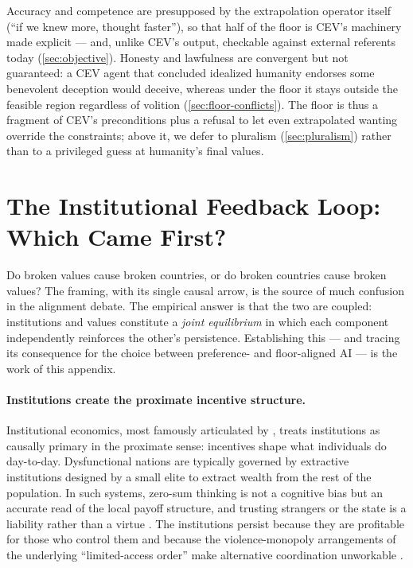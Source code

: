 \documentclass{article}
\theoremstyle{plain}
\theoremstyle{definition}
\theoremstyle{remark}
\begin{document}
Accuracy and competence are presupposed by the extrapolation operator itself (``if we knew more, thought faster''), so that half of the floor is CEV's machinery made explicit --- and, unlike CEV's output, checkable against external referents today (\cref{sec:objective}). Honesty and lawfulness are convergent but not guaranteed: a CEV agent that concluded idealized humanity endorses some benevolent deception \citep{taylorbrown1988illusion} would deceive, whereas under the floor it stays outside the feasible region regardless of volition (\cref{sec:floor-conflicts}). The floor is thus a fragment of CEV's preconditions plus a refusal to let even extrapolated wanting override the constraints; above it, we defer to pluralism (\cref{sec:pluralism}) rather than to a privileged guess at humanity's final values.




\newpage
\appendix
\onecolumn
\section{The Institutional Feedback Loop: Which Came First?}
\label{app:institutions}

Do broken values cause broken countries, or do broken countries cause broken values? The framing, with its single causal arrow, is the source of much confusion in the alignment debate. The empirical answer is that the two are coupled: institutions and values constitute a \emph{joint equilibrium} in which each component independently reinforces the other's persistence. Establishing this --- and tracing its consequence for the choice between preference- and floor-aligned AI --- is the work of this appendix.

\paragraph{Institutions create the proximate incentive structure.} Institutional economics, most famously articulated by \citet{acemoglu2012why}, treats institutions as causally primary in the proximate sense: incentives shape what individuals do day-to-day. Dysfunctional nations are typically governed by extractive institutions designed by a small elite to extract wealth from the rest of the population. In such systems, zero-sum thinking is not a cognitive bias but an accurate read of the local payoff structure, and trusting strangers or the state is a liability rather than a virtue \citep{north1990institutions, tabellini2010culture}. The institutions persist because they are profitable for those who control them and because the violence-monopoly arrangements of the underlying ``limited-access order'' make alternative coordination unworkable \citep{northwallisweingast2009}.
\end{document}
